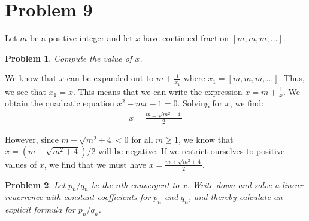\documentclass[psamsfonts]{amsart}
\newtheorem{prob}{Problem}[section]
\newenvironment{sol}{{\bfseries Solution}}{\qedsymbol}
\theoremstyle{definition}
\theoremstyle{remark}
\numberwithin{equation}{section}
\begin{document}
\section{Problem 9}

Let $m$ be a positive integer and let $x$ have continued fraction $[m,m,m, \ldots]$. 

\begin{prob}
Compute the value of $x$. 
\end{prob}

\begin{sol}
We know that $x$ can be expanded out to $m + \frac{1}{x_1}$ where $x_1 = [m, m, m, \ldots]$. Thus, we see that $x_1 = x$. This means that we can write the expression $x = m + \frac{1}{x}$. We obtain the quadratic equation $x^2 - mx - 1 = 0$. Solving for $x$, we find:
\begin{eqnarray}
x = \frac{ m \pm \sqrt{m^2 + 4}}{2}
\end{eqnarray}

However, since $m - \sqrt{m^2 + 4} < 0$ for all $m \geq 1$, we know that $x = (m - \sqrt{m^2 +4})/2$ will be negative. If we restrict ourselves to positive values of $x$, we find that we must have $x = \frac{m + \sqrt{m^2 +4}}{2}$. 
\end{sol}

\begin{prob}
Let $p_n/q_n$ be the $n$th convergent to $x$. Write down and solve a linear reucrrence with constant coefficients for $p_n$ and $q_n$, and thereby calculate an explicit formula for $p_n/q_n$. 
\end{prob}
\end{document}
